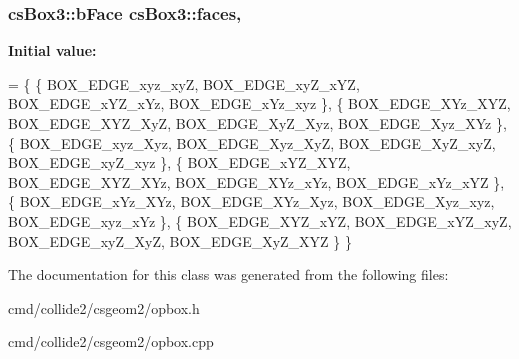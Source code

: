 \subsubsection[{\texorpdfstring{faces}{faces}}]{\setlength{\rightskip}{0pt plus 5cm}cs\+Box3\+::b\+Face cs\+Box3\+::faces\hspace{0.3cm}{\ttfamily [static]}, {\ttfamily [protected]}}\hypertarget{classcsBox3_a32f9a6acf0712aacec04638bfba9ceae}{}\label{classcsBox3_a32f9a6acf0712aacec04638bfba9ceae}
{\bfseries Initial value\+:}
\begin{DoxyCode}
=
  \{
    \{ BOX\_EDGE\_xyz\_xyZ, BOX\_EDGE\_xyZ\_xYZ, BOX\_EDGE\_xYZ\_xYz, BOX\_EDGE\_xYz\_xyz \},
    \{ BOX\_EDGE\_XYz\_XYZ, BOX\_EDGE\_XYZ\_XyZ, BOX\_EDGE\_XyZ\_Xyz, BOX\_EDGE\_Xyz\_XYz \},
    \{ BOX\_EDGE\_xyz\_Xyz, BOX\_EDGE\_Xyz\_XyZ, BOX\_EDGE\_XyZ\_xyZ, BOX\_EDGE\_xyZ\_xyz \},
    \{ BOX\_EDGE\_xYZ\_XYZ, BOX\_EDGE\_XYZ\_XYz, BOX\_EDGE\_XYz\_xYz, BOX\_EDGE\_xYz\_xYZ \},
    \{ BOX\_EDGE\_xYz\_XYz, BOX\_EDGE\_XYz\_Xyz, BOX\_EDGE\_Xyz\_xyz, BOX\_EDGE\_xyz\_xYz \},
    \{ BOX\_EDGE\_XYZ\_xYZ, BOX\_EDGE\_xYZ\_xyZ, BOX\_EDGE\_xyZ\_XyZ, BOX\_EDGE\_XyZ\_XYZ \}
  \}
\end{DoxyCode}


The documentation for this class was generated from the following files\+:\begin{DoxyCompactItemize}
\item 
cmd/collide2/csgeom2/opbox.\+h\item 
cmd/collide2/csgeom2/opbox.\+cpp\end{DoxyCompactItemize}
